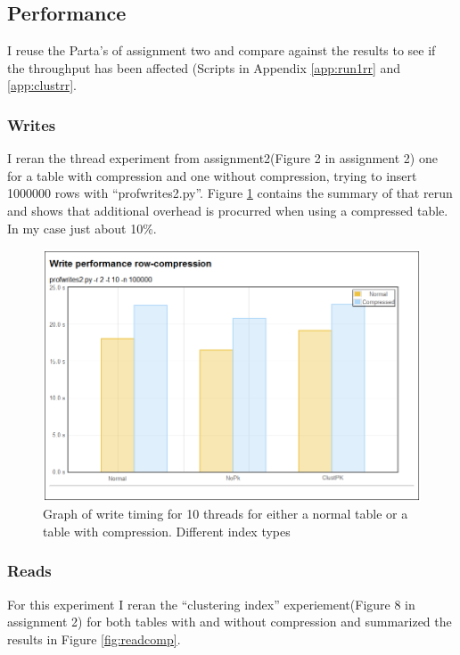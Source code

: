 \subsection{Performance}
I reuse the Parta's of assignment two and compare against the results to see if
the throughput has been affected (Scripts in Appendix \ref{app:run1rr} and
\ref{app:clustrr}.

\subsubsection{Writes}
I reran the thread experiment from assignment2(Figure 2 in assignment 2) one for a table with compression
and one without compression, trying to insert 1000000 rows with
``profwrites2.py''. Figure \ref{fig:writecomp} contains the summary of that rerun and
shows that additional overhead is
procurred when using a compressed table. In my case just about 10\%.
\begin{figure}
  \centering
  \includegraphics[width=12cm]{assignment3/writecomp}
  \caption[Write performance - compress]{Graph of write timing
  for 10 threads for either a normal table or a table with
  compression. Different index types}\label{fig:writecomp}
\end{figure}

\subsubsection{Reads}
For this experiment I reran the ``clustering index'' experiement(Figure 8 in
assignment 2) for both tables with and without compression and summarized the
results in Figure \ref{fig:readcomp}.

